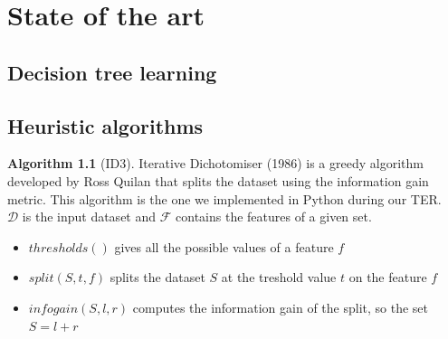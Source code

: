 \documentclass[12pt]{report}
\theoremstyle{definition}
\theoremstyle{definition}
\newtheorem*{algo}{Algorithm}
\theoremstyle{definition}
\begin{document}
\chapter{State of the art}
\section{Decision tree learning} %
\section{Heuristic algorithms}
\begin{algo}[ID3]
    Iterative Dichotomiser (1986) is a greedy algorithm developed by Ross Quilan that splits the dataset
    using the information gain metric. This algorithm is the one we implemented in Python during our TER.\\
    $\mathcal{D}$ is the input dataset and $\mathcal{F}$ contains the features of a given set.

\begin{algorithm}
    \caption{ID3}\label{alg:two}
    \DontPrintSemicolon

    \;
    \;

\end{algorithm}

\begin{itemize}
    \item $thresholds()$ gives all the possible values of a feature $f$
    \item $split(S, t, f)$ splits the dataset $S$ at the treshold value $t$ on the feature $f$
    \item $infogain(S, l, r)$ computes the information gain of the split, so the set $S=l+r$ 
\end{itemize}
\end{algo}
\end{document}
